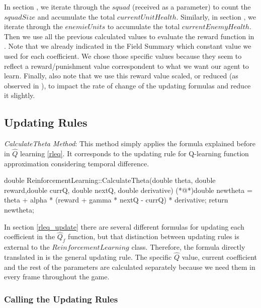 In section , we iterate through the $squad$ (received as a parameter) to count the $squadSize$ and accumulate the total $currentUnitHealth$. Similarly, in section , we iterate through the $enemieUnits$ to accumulate the total $currentEnemyHealth$.\\

Then we use all the previous calculated values to evaluate the reward function in . Note that we already indicated in the Field Summary which constant value we used for each coefficient. We chose those specific values because they seem to reflect a reward/punishment value correspondent to what we want our agent to learn. Finally, also note that we use this reward value scaled, or reduced (as observed in ), to impact the rate of change of the updating formulas and reduce it slightly. \\

\subsection{Updating Rules}

\textit{CalculateTheta Method}: This method simply applies the formula explained before in $\hat{Q}$ learning \ref{rleq}. It corresponds to the updating rule for Q-learning function approximation considering temporal difference.\\

\begin{Sourcecode}[caption=CalculateTheta Method]
double ReinforcementLearning::CalculateTheta(double theta, double reward,double currQ, double nextQ, double derivative)
{
	(*@\lnote@*)double newtheta = theta + alpha * (reward + gamma * nextQ - currQ) * derivative;
	return newtheta;
}
\end{Sourcecode}

In section \ref{rleq_update} there are several different formulas for updating each coefficient in the $\hat{Q}_f$ function, but that distinction between updating rules is external to the $ReinforcementLearning$ class. Therefore, the formula directly translated in  is the general updating rule. The specific $\hat{Q}$ value, current coefficient and the rest of the parameters are calculated separately because we need them in every frame throughout the game. \\

\subsubsection{Calling the Updating Rules}

